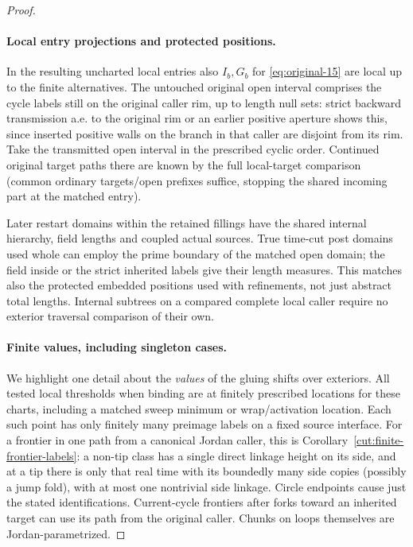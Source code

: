 \begin{proof}
\paragraph{Local entry projections and protected positions.}

In the resulting uncharted local entries also \(I_b,G_b\) for \eqref{eq:original-15} are local up to the
finite alternatives. The untouched original open interval comprises the cycle labels still on the original
caller rim, up to length null sets: strict backward transmission a.e. to the original rim or an earlier
positive aperture shows this, since inserted positive walls on the branch in that caller are disjoint from
its rim. Take the transmitted open interval in the prescribed cyclic order. Continued original target paths
there are known by the full local-target comparison (common ordinary targets/open prefixes suffice, stopping
the shared incoming part at the matched entry).

Later restart domains within the retained fillings have the
shared internal hierarchy, field lengths and coupled actual sources. True time-cut post domains used whole
can employ the prime boundary of the matched open domain; the field inside or the strict inherited labels
give their length measures. This matches also the protected embedded positions used with refinements, not
just abstract total lengths. Internal subtrees on a compared complete local caller require no exterior
traversal comparison of their own.

\paragraph{Finite values, including singleton cases.}

We highlight one detail about the \emph{values} of the gluing shifts over exteriors. All tested local
thresholds when binding are at finitely prescribed locations for these charts, including a matched sweep
minimum or wrap/activation location. Each such point has only finitely many preimage labels on a fixed
source interface. For a frontier in one path from a canonical Jordan caller, this is
Corollary~\ref{cut:finite-frontier-labels}: a non-tip class has a single direct linkage height on its side, and at a tip there is
only that real time with its boundedly many side copies (possibly a jump fold), with at most one nontrivial
side linkage. Circle endpoints cause just the stated identifications. Current-cycle frontiers after forks
toward an inherited target can use its path from the original caller. Chunks on loops themselves are
Jordan-parametrized.


\end{proof}
